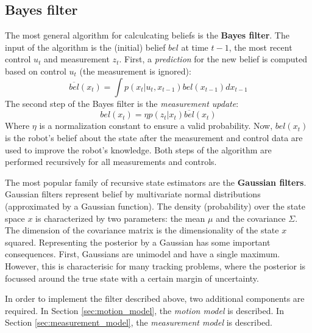 \subsection{Bayes filter}
The most general algorithm for calculcating beliefs is the \textbf{Bayes filter}.
The input of the algorithm is the (initial) belief $bel$ at time $t-1$, the most recent control $u_t$ and measurement $z_t$.
First, a \textit{prediction} for the new belief is computed based on control $u_t$ (the measurement is ignored):
\begin{equation}
\label{eq:background-theory-bayes-predict}
\overline{bel}(x_t) = \int p(x_t | u_t, x_{t-1}) bel(x_{t-1}) dx_{t-1}
\end{equation}
The second step of the Bayes filter is the \textit{measurement update}:
\begin{equation}
\label{eq:background-theory-bayes-measurement}
bel(x_t) = \eta p(z_t | x_t) \overline{bel}(x_t)
\end{equation}
Where $\eta$ is a normalization constant to ensure a valid probability.
Now, $bel(x_t)$ is the robot's belief about the state after the measurement and control data are used to improve the robot's knowledge.
Both steps of the algorithm are performed recursively for all measurements and controls.

The most popular family of recursive state estimators are the \textbf{Gaussian filters}.
Gaussian filters represent belief by multivariate normal distributions (approximated by a Gaussian function).
The density (probability) over the state space $x$ is characterized by two parameters: the mean $\mu$ and the covariance $\Sigma$.
The dimension of the covariance matrix is the dimensionality of the state $x$ squared.
Representing the posterior by a Gaussian has some important consequences.
First, Gaussians are unimodel and have a single maximum.
However, this is characterisic for many tracking problems, where the posterior is focussed around the true state with a certain margin of uncertainty.

In order to implement the filter described above, two additional components are required.
In Section \ref{sec:motion_model}, the \textit{motion model} is described.
In Section \ref{sec:measurement_model}, the \textit{measurement model} is described.

